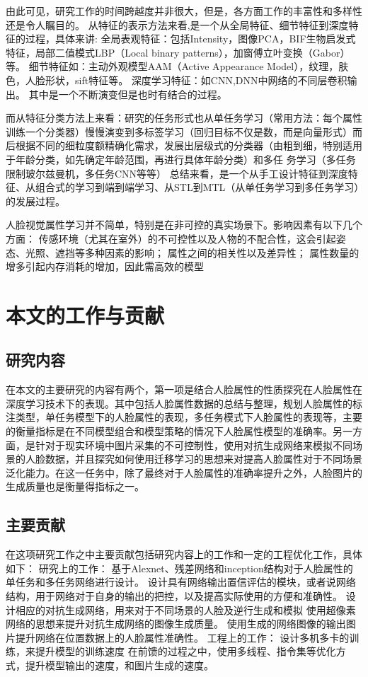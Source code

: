 由此可见，研究工作的时间跨越度并非很大，但是，各方面工作的丰富性和多样性还是令人瞩目的。
从特征的表示方法来看,是一个从全局特征、细节特征到深度特征的过程，具体来讲:
全局表观特征：包括Intensity，图像PCA，BIF生物启发式特征，局部二值模式LBP（Local binary patterns），加窗傅立叶变换（Gabor）等。
细节特征如：主动外观模型AAM（Active  Appearance  Model），纹理，肤色，人脸形状，sift特征等。
深度学习特征：如CNN,DNN中网络的不同层卷积输出。
其中是一个不断演变但是也时有结合的过程。

而从特征分类方法上来看：研究的任务形式也从单任务学习（常用方法：每个属性训练一个分类器）慢慢演变到多标签学习（回归目标不仅是数，而是向量形式）而后根据不同的细粒度额精确化需求，发展出层级式的分类器（由粗到细，特别适用于年龄分类，如先确定年龄范围，再进行具体年龄分类）和多任
务学习（多任务限制玻尔兹曼机，多任务CNN等等）
总结来看，是一个从手工设计特征到深度特征、从组合式的学习到端到端学习、从STL到MTL（从单任务学习到多任务学习）的发展过程。

人脸视觉属性学习并不简单，特别是在非可控的真实场景下。影响因素有以下几个方面：
传感环境（尤其在室外）的不可控性以及人物的不配合性，这会引起姿态、光照、遮挡等多种因素的影响；
属性之间的相关性以及差异性；
属性数量的增多引起内存消耗的增加，因此需高效的模型

\section{本文的工作与贡献}
\subsection{研究内容}
在本文的主要研究的内容有两个，第一项是结合人脸属性的性质探究在人脸属性在深度学习技术下的表现。其中包括人脸属性数据的总结与整理，规划人脸属性的标注类型，单任务模型下的人脸属性的表现，多任务模式下人脸属性的表现等，主要的衡量指标是在不同模型组合和模型策略的情况下人脸属性模型的准确率。另一方面，是针对于现实环境中图片采集的不可控制性，使用对抗生成网络来模拟不同场景的人脸数据，并且探究如何使用迁移学习的思想来对提高人脸属性对于不同场景泛化能力。在这一任务中，除了最终对于人脸属性的准确率提升之外，人脸图片的生成质量也是衡量得指标之一。
\subsection{主要贡献}
在这项研究工作之中主要贡献包括研究内容上的工作和一定的工程优化工作，具体如下：
研究上的工作：
基于Alexnet、残差网络和inception结构对于人脸属性的单任务和多任务网络进行设计。
设计具有网络输出置信评估的模块，或者说网络结构，用于网络对于自身的输出的把控，以及提高实际使用的方便和准确性。
设计相应的对抗生成网络，用来对于不同场景的人脸及逆行生成和模拟
使用超像素网络的思想来提升对抗生成网络的图像生成质量。
使用生成的网络图像的输出图片提升网络在位置数据上的人脸属性准确性。
工程上的工作：
设计多机多卡的训练，来提升模型的训练速度
在前馈的过程之中，使用多线程、指令集等优化方式，提升模型输出的速度，和图片生成的速度。

